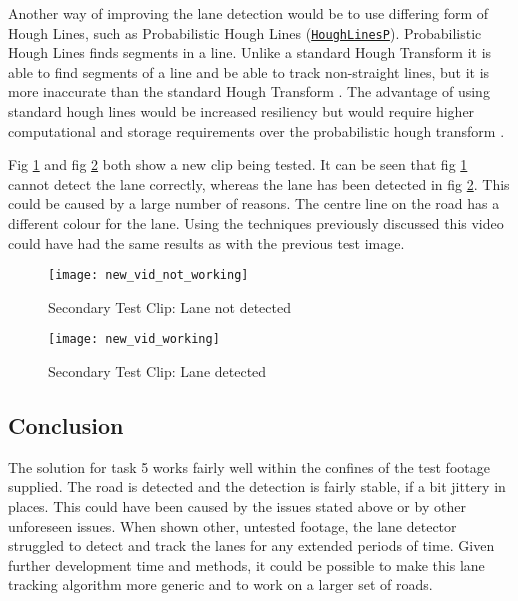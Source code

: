 \documentclass[conference]{IEEEtran}
\begin{document}
Another way of improving the lane detection would be to use differing form of Hough Lines, such as Probabilistic Hough Lines (\href{https://docs.opencv.org/4.x/dd/d1a/group__imgproc__feature.html#ga8618180a5948286384e3b7ca02f6feeb}{\texttt{HoughLinesP}}). Probabilistic Hough Lines finds segments in a line. Unlike a standard Hough Transform it is able to find segments of a line and be able to track non-straight lines, but it is more inaccurate than the standard Hough Transform \cite{hough_book}. The advantage of using standard hough lines would be increased resiliency but would require higher computational and storage requirements over the probabilistic hough transform \cite{improvement_to_hough_lines}. 

Fig \ref{fig:new_vid_not_working} and fig \ref{fig:new_vid_working} both show a new clip being tested. It can be seen that fig \ref{fig:new_vid_not_working} cannot detect the lane correctly, whereas the lane has been detected in fig \ref{fig:new_vid_working}. This could be caused by a large number of reasons. The centre line on the road has a different colour for the lane. Using the techniques previously discussed this video could have had the same results as with the previous test image. 

\begin{figure}[H]
\centerline{\texttt{[image: new\_vid\_not\_working]}}
\caption{Secondary Test Clip: Lane not detected}
\label{fig:new_vid_not_working}
\end{figure}

\begin{figure}[H]
\centerline{\texttt{[image: new\_vid\_working]}}
\caption{Secondary Test Clip: Lane detected}
\label{fig:new_vid_working}
\end{figure}

\subsection{Conclusion}

The solution for task 5 works fairly well within the confines of the test footage supplied. The road is detected and the detection is fairly stable, if a bit jittery in places. This could have been caused by the issues stated above or by other unforeseen issues. When shown other, untested footage, the lane detector struggled to detect and track the lanes for any extended periods of time. Given further development time and methods, it could be possible to make this lane tracking algorithm more generic and to work on a larger set of roads. 
\end{document}
